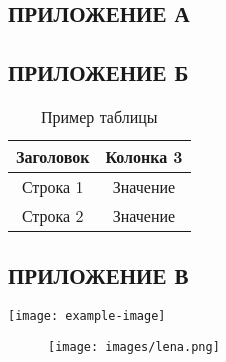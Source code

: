 \begin{center}
    \section*{ПРИЛОЖЕНИЕ А}
\end{center}


\newpage


\begin{center}
    \section*{ПРИЛОЖЕНИЕ Б}
\end{center}

\begin{table}[H]

\captionsetup{justification=raggedright,singlelinecheck=false}
\caption{Пример таблицы}
\captionsetup{justification=justified,singlelinecheck=false}

\begin{tabular}{|c|c|}
\hline
\textbf{Заголовок} & \textbf{Колонка 3} \\ \hline
Строка 1           & Значение           \\ \hline
Строка 2           & Значение           \\ \hline
\end{tabular}

\end{table}


\newpage


\begin{center}
    \section*{ПРИЛОЖЕНИЕ В}
    \texttt{[image: example-image]}
\end{center}


\begin{figure}
\centering
\texttt{[image: images/lena.png]}
\end{figure}
